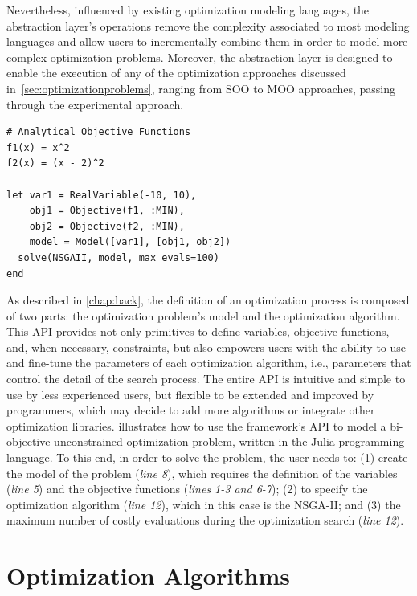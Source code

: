 Nevertheless, influenced by existing optimization modeling languages, the abstraction layer's operations remove the complexity associated to most modeling languages and allow users to incrementally combine them in order to model more complex optimization problems. Moreover, the abstraction layer is designed to enable the execution of any of the optimization approaches discussed in~\cref{sec:optimizationproblems}, ranging from \ac{SOO} to \ac{MOO} approaches, passing through the experimental approach.

\begin{lstlisting}[caption={Simple example of the framework's API being used in a script written in the Julia programming language},label=juliaCode]
# Analytical Objective Functions
f1(x) = x^2
f2(x) = (x - 2)^2

let var1 = RealVariable(-10, 10),
	obj1 = Objective(f1, :MIN),
	obj2 = Objective(f2, :MIN),
	model = Model([var1], [obj1, obj2])
  solve(NSGAII, model, max_evals=100) 
end
\end{lstlisting}

As described in \cref{chap:back}, the definition of an optimization process is composed of two parts: the optimization problem's model and the optimization algorithm. This \ac{API} provides not only primitives to define variables, objective functions, and, when necessary, constraints, but also empowers users with the ability to use and fine-tune the parameters of each optimization algorithm, i.e., parameters that control the detail of the search process. The entire \ac{API} is intuitive and simple to use by less experienced users, but flexible to be extended and improved by programmers, which may decide to add more algorithms or integrate other optimization libraries.  illustrates how to use the framework's \ac{API} to model a bi-objective unconstrained optimization problem, written in the Julia programming language. To this end, in order to solve the problem, the user needs to: (1) create the model of the problem (\textit{line 8}), which requires the definition of the variables (\textit{line 5}) and the objective functions (\textit{lines 1-3 and 6-7}); (2) to specify the optimization algorithm (\textit{line 12}), which in this case is the \ac{NSGA-II}; and (3) the maximum number of costly evaluations during the optimization search (\textit{line 12}).


\section{Optimization Algorithms}
\label{sec:optalgos}

